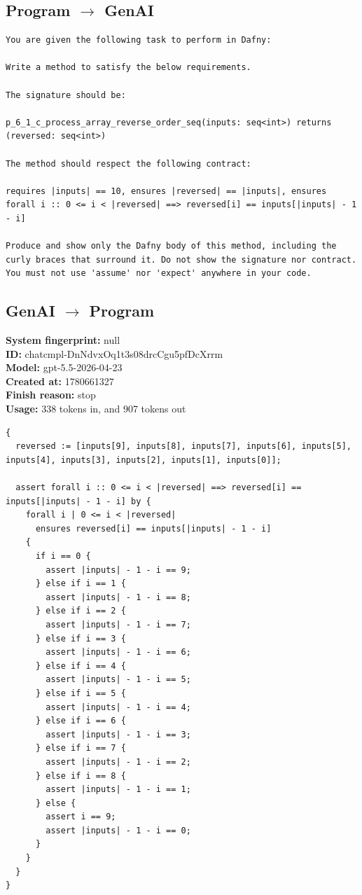 \documentclass{article}
\begin{document}
\subsection*{Program $\rightarrow$ GenAI}
\begin{lstlisting}
You are given the following task to perform in Dafny:

Write a method to satisfy the below requirements.

The signature should be:

p_6_1_c_process_array_reverse_order_seq(inputs: seq<int>) returns (reversed: seq<int>)

The method should respect the following contract:

requires |inputs| == 10, ensures |reversed| == |inputs|, ensures forall i :: 0 <= i < |reversed| ==> reversed[i] == inputs[|inputs| - 1 - i]

Produce and show only the Dafny body of this method, including the curly braces that surround it. Do not show the signature nor contract. You must not use 'assume' nor 'expect' anywhere in your code.
\end{lstlisting}
\subsection*{GenAI $\rightarrow$ Program}
\textbf{System fingerprint: }null
\\\textbf{ID: }chatcmpl-DnNdvxOq1t3s08drcCgu5pfDcXrrm
\\\textbf{Model: }gpt-5.5-2026-04-23
\\\textbf{Created at: }1780661327
\\\textbf{Finish reason: }stop
\\\textbf{Usage: }338 tokens in, and 907 tokens out
\begin{lstlisting}
{
  reversed := [inputs[9], inputs[8], inputs[7], inputs[6], inputs[5], inputs[4], inputs[3], inputs[2], inputs[1], inputs[0]];

  assert forall i :: 0 <= i < |reversed| ==> reversed[i] == inputs[|inputs| - 1 - i] by {
    forall i | 0 <= i < |reversed|
      ensures reversed[i] == inputs[|inputs| - 1 - i]
    {
      if i == 0 {
        assert |inputs| - 1 - i == 9;
      } else if i == 1 {
        assert |inputs| - 1 - i == 8;
      } else if i == 2 {
        assert |inputs| - 1 - i == 7;
      } else if i == 3 {
        assert |inputs| - 1 - i == 6;
      } else if i == 4 {
        assert |inputs| - 1 - i == 5;
      } else if i == 5 {
        assert |inputs| - 1 - i == 4;
      } else if i == 6 {
        assert |inputs| - 1 - i == 3;
      } else if i == 7 {
        assert |inputs| - 1 - i == 2;
      } else if i == 8 {
        assert |inputs| - 1 - i == 1;
      } else {
        assert i == 9;
        assert |inputs| - 1 - i == 0;
      }
    }
  }
}
\end{lstlisting}
\end{document}
